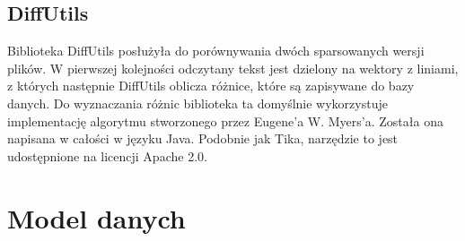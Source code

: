 \subsection*{DiffUtils}

Biblioteka DiffUtils posłużyła do porównywania dwóch sparsowanych wersji plików.
W pierwszej kolejności odczytany tekst jest dzielony na wektory z liniami, z których następnie DiffUtils oblicza różnice, które są zapisywane do bazy danych.
Do wyznaczania różnic biblioteka ta domyślnie wykorzystuje implementację algorytmu stworzonego przez Eugene'a W. Myers'a.
Została ona napisana w całości w języku Java.
Podobnie jak Tika, narzędzie to jest udostępnione na licencji Apache 2.0.

\section{Model danych}

